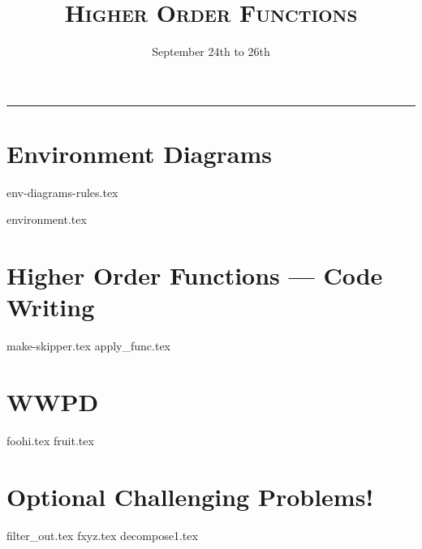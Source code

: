 \documentclass{exam}
\title{\textsc{Higher Order Functions}}
\date{September 24th to 26th}
\begin{document}
\maketitle
\rule{\textwidth}{0.15em}
\fontsize{12}{15}\selectfont



\vspace{-2em}
\section{Environment Diagrams}
{env-diagrams-rules.tex}
\newpage
\begin{questions}
{environment.tex}



\end{questions}


\newpage
\section{Higher Order Functions — Code Writing}
\begin{questions}
{make-skipper.tex}
{apply_func.tex}


\newpage
\section{WWPD}
\begin{questions}
{foohi.tex}
\newpage
{fruit.tex}
\end{questions}

\newpage
\section{Optional Challenging Problems!}
{filter_out.tex}
{fxyz.tex}
{decompose1.tex}

\end{questions}
\end{document}
